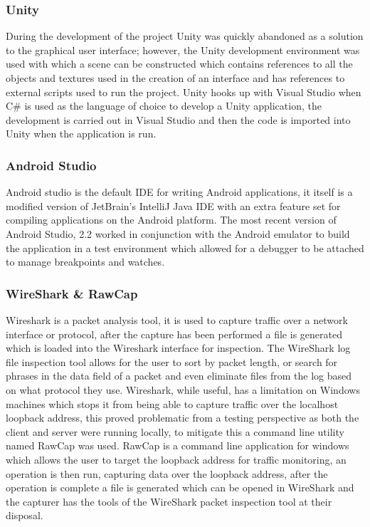 \documentclass{article}
\begin{document}
\subsubsection{Unity}
During the development of the project Unity was quickly abandoned as a solution to the graphical user interface; however, the Unity development environment was used with which a scene can be constructed which contains references to all the objects and textures used in the creation of an interface and has references to external scripts used to run the project. Unity hooks up with Visual Studio when C\# is used as the language of choice to develop a Unity application, the development is carried out in Visual Studio and then the code is imported into Unity when the application is run.
\subsubsection{Android Studio}
Android studio is the default IDE for writing Android applications, it itself is a modified version of JetBrain’s IntelliJ Java IDE with an extra feature set for compiling applications on the Android platform. The most recent version of Android Studio, 2.2 worked in conjunction with the Android emulator to build the application in a test environment which allowed for a debugger to be attached to manage breakpoints and watches.
\subsubsection{WireShark \& RawCap}
Wireshark is a packet analysis tool, it is used to capture traffic over a network interface or protocol, after the capture has been performed a file is generated which is loaded into the Wireshark interface for inspection. The WireShark log file inspection tool allows for the user to sort by packet length, or search for phrases in the data field of a packet and even eliminate files from the log based on what protocol they use. Wireshark, while useful, has a limitation on Windows machines which stops it from being able to capture traffic over the localhost loopback address, this proved problematic from a testing perspective as both the client and server were running locally, to mitigate this a command line utility named RawCap was used. RawCap is a command line application for windows which allows the user to target the loopback address for traffic monitoring, an operation is then run, capturing data over the loopback address, after the operation is complete a file is generated which can be opened in WireShark and the capturer has the tools of the WireShark packet inspection tool at their disposal.
\end{document}
